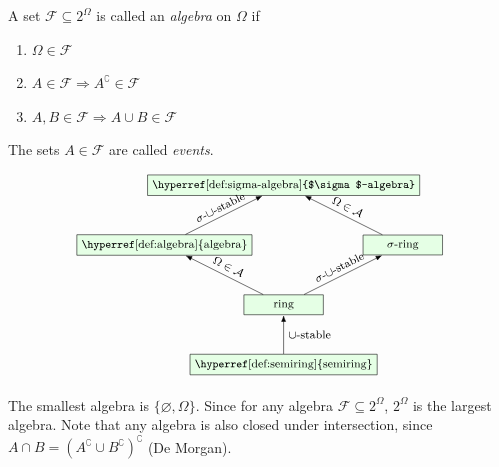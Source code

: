 \begin{definition}[Algebra]\label{def:algebra}
A set $\mathcal{F}\subseteq 2^\Omega$ is called an \emph{algebra} on $\Omega$ if
\begin{enumerate}[label=(\roman*)]
  \item $\Omega \in \mathcal{F}$ \label{def:algebra-contains-samplespace}
  \item $A \in \mathcal{F} \Rightarrow A^\complement \in \mathcal{F}$ \label{def:algebra-closed-under-complement}
  \item $A,B \in \mathcal{F} \Rightarrow A \cup B \in \mathcal{F}$ \label{def:algebra-closed-under-union}
\end{enumerate}
The sets $A \in \mathcal{F}$ are called \emph{events}.
\end{definition}


\tikzexternaldisable
\[
\begin{tikzpicture}[
    >=Latex,
    node distance=1cm and 1.4cm,
    every node/.style={font=\footnotesize},
    box/.style={
        draw,
        fill=green!10,
        minimum width=2cm,
        minimum height=0.5cm,
        align=center
    }
]

\node[box] (sigmaalg) at (0,4.5) {\hyperref[def:sigma-algebra]{$\sigma$-algebra}};

\node[box] (alg)      at (-3,3) {\hyperref[def:algebra]{algebra}};
\node[box] (sigmaring) at (3,3) {$\sigma$-ring};

\node[box] (ring)     at (0,1.5) {ring};
\node[box] (semiring) at (0,0) {\hyperref[def:semiring]{semiring}};

\draw[->] (alg) -- node[above, sloped] {$\sigma$-$\cup$-stable} (sigmaalg);
\draw[->] (sigmaring) -- node[above, sloped] {$\Omega\in\mathcal A$} (sigmaalg);

\draw[->] (ring) -- node[above, sloped] {$\Omega\in\mathcal A$} (alg);
\draw[->] (ring) -- node[above, sloped] {$\sigma$-$\cup$-stable} (sigmaring);

\draw[->] (semiring) -- node[right] {$\cup$-stable} (ring);

\end{tikzpicture}
\]
\tikzexternalenable


The smallest algebra is $\{\varnothing,\Omega\}$.
Since for any algebra $\mathcal{F}\subseteq 2^\Omega$, $2^\Omega$ is the largest algebra.
Note that any algebra is also closed under intersection, since
$A \cap B = (A^\complement \cup B^\complement)^\complement$ (De Morgan).



